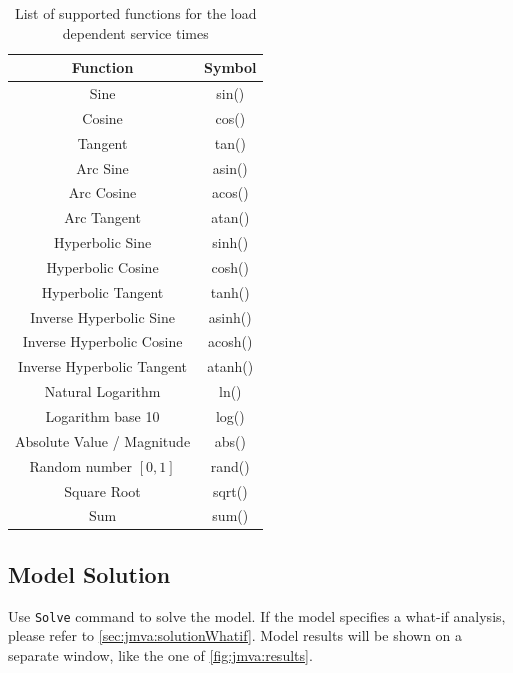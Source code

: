 \begin{table}[htbp]
\begin{center}
\begin{tabular}{|c|c|}
Function & Symbol\\
\hline
Sine & sin()\\
Cosine & cos()\\
Tangent & tan()\\
Arc Sine & asin()\\
Arc Cosine & acos()\\
Arc Tangent & atan()\\
Hyperbolic Sine & sinh()\\
Hyperbolic Cosine & cosh()\\
Hyperbolic Tangent & tanh()\\
Inverse Hyperbolic Sine & asinh()\\
Inverse Hyperbolic Cosine & acosh()\\
Inverse Hyperbolic Tangent & atanh()\\
Natural Logarithm & ln()\\
Logarithm base 10 & log()\\
Absolute Value / Magnitude & abs()\\
Random number $[0,1]$ & rand()\\
Square Root & sqrt()\\
Sum & sum()\\
\hline
\end{tabular}
\end{center}
\caption{List of supported functions for the load dependent service
times} \label{tab:jmva:Functions}
\end{table}

\subsection{Model Solution}
\label{sec:jmva:solution}Use \texttt{Solve} command to solve the
model. If the model specifies a what-if analysis, please refer to
\autoref{sec:jmva:solutionWhatif}. Model results will be shown on a
separate window, like the one of \autoref{fig:jmva:results}.

